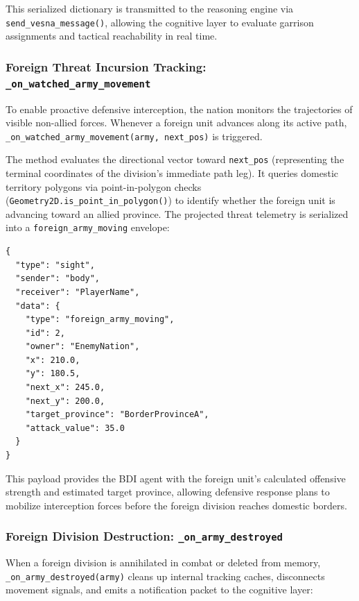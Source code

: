 This serialized dictionary is transmitted to the reasoning engine via \texttt{send\_vesna\_message()}, allowing the cognitive layer to evaluate garrison assignments and tactical reachability in real time.

\subsubsection{Foreign Threat Incursion Tracking: \texttt{\_on\_watched\_army\_movement}}
To enable proactive defensive interception, the nation monitors the trajectories of visible non-allied forces. Whenever a foreign unit advances along its active path, \texttt{\_on\_watched\_army\_movement(army, next\_pos)} is triggered.

The method evaluates the directional vector toward \texttt{next\_pos} (representing the terminal coordinates of the division's immediate path leg). It queries domestic territory polygons via point-in-polygon checks (\texttt{Geometry2D.is\_point\_in\_polygon()}) to identify whether the foreign unit is advancing toward an allied province. The projected threat telemetry is serialized into a \texttt{foreign\_army\_moving} envelope:

\begin{lstlisting}[caption={Structure of the foreign threat trajectory JSON packet.}, label={lst:foreign_army_moving_json}]
{
  "type": "sight",
  "sender": "body",
  "receiver": "PlayerName",
  "data": {
    "type": "foreign_army_moving",
    "id": 2,
    "owner": "EnemyNation",
    "x": 210.0,
    "y": 180.5,
    "next_x": 245.0,
    "next_y": 200.0,
    "target_province": "BorderProvinceA",
    "attack_value": 35.0
  }
}
\end{lstlisting}

This payload provides the BDI agent with the foreign unit's calculated offensive strength and estimated target province, allowing defensive response plans to mobilize interception forces before the foreign division reaches domestic borders.

\subsubsection{Foreign Division Destruction: \texttt{\_on\_army\_destroyed}}
When a foreign division is annihilated in combat or deleted from memory, \texttt{\_on\_army\_destroyed(army)} cleans up internal tracking caches, disconnects movement signals, and emits a notification packet to the cognitive layer:

